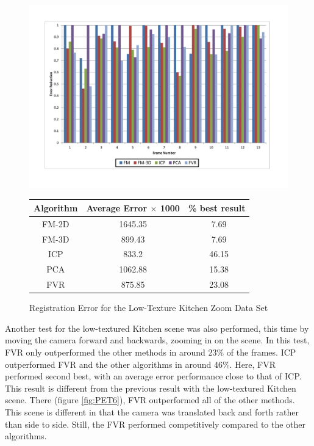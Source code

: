 \begin{figure}
\centering
\includegraphics[width=6in]{images/results/Kitchen_Little_Texture_Zoom}
\caption{Registration Error for the Low-Texture Kitchen Zoom Data Set}
\label{fig:PET7}

\begin{tabular}{ccc}
\hline
\textbf{Algorithm} & \textbf{Average Error $\times$ 1000} & \textbf{\% best result}\\ \hline
FM-2D	& 1645.35 & ~7.69\\
FM-3D	& 899.43 & ~7.69\\
ICP		& 833.2 & ~46.15\\
PCA		& 1062.88 & ~15.38\\
FVR		& 875.85 & ~23.08\\
\end{tabular}
\end{figure} 



Another test for the low-textured Kitchen scene was also performed, this time by moving the camera forward and backwards, zooming in on the scene. In this test, FVR only outperformed the other methods in around 23\% of the frames. ICP outperformed FVR and the other algorithms in around 46\%. Here, FVR performed second best, with an average error performance close to that of ICP. This result is different from the previous result with the low-textured Kitchen scene. There (figure \ref{fig:PET6}), FVR outperformed all of the other methods. This scene is different in that the camera was translated back and forth rather than side to side. Still, the FVR performed competitively compared to the other algorithms.  \\


